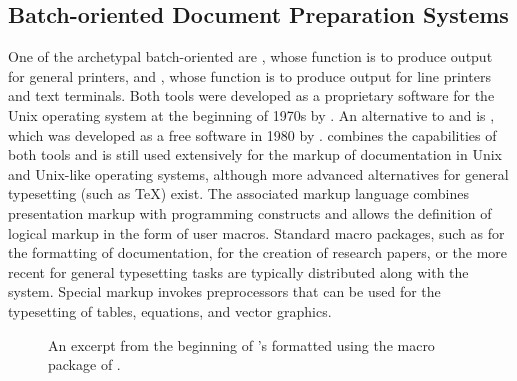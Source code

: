 \documentclass{book}
\begin{document}
\subsection{Batch-oriented Document Preparation Systems}
One of the archetypal batch-oriented  are %
, whose function is to produce output for general
printers, and %
, whose function is to
produce output for line printers and text terminals. Both tools were developed
as a proprietary software for the Unix operating system at the beginning of
1970s by . An alternative to  and 
is , which
was developed as a free software in 1980 by . 
combines the capabilities of both tools and is still used extensively for the
markup of documentation in Unix and Unix-like operating systems, although more
advanced alternatives for general typesetting (such as \TeX) exist. The
associated markup language combines presentation markup with programming
constructs and allows the definition of logical markup in the form of user
macros. Standard macro packages, such as  for the
 formatting of documentation,
  for the creation
of research papers, or the more recent 
 for general typesetting tasks
are typically distributed along with the system. Special markup invokes
preprocessors that can be used for the typesetting of tables, equations, and
vector graphics.

\begin{figure}
  \caption{An excerpt from the beginning of 's
     formatted using the 
    macro package of .}
  \label{fig:poe}
\end{figure}

\end{document}
